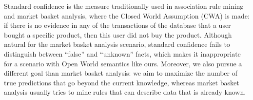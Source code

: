 Standard confidence is the measure traditionally used in association rule mining and market basket analysis, where the Closed World Assumption (CWA) is made:
if there is no evidence in any of the transactions of the database that a user bought a specific product, then this user did not buy the product.
Although natural for the market basket analysis scenario, standard confidence fails to distinguish between ``false'' and ``unknown'' facts,
which makes it inappropriate for a scenario with Open World semantics like ours. Moreover, we also pursue a different goal than market basket analysis:
we aim to maximize the number of true predictions that go beyond the current knowledge,
whereas market basket analysis usually tries to mine rules that can describe data that is already known.






